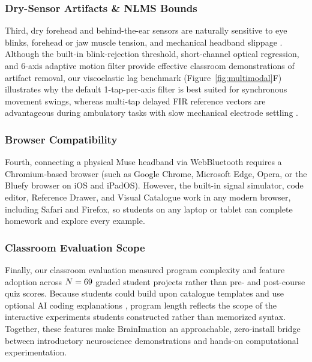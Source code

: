 \documentclass[11pt]{article}
\begin{document}
\subsubsection{Dry-Sensor Artifacts \& NLMS Bounds}
Third, dry forehead and behind-the-ear sensors are naturally sensitive to eye blinks, forehead or jaw muscle tension, and mechanical headband slippage \citep{lotte2013flaws,mathewson2017high,saager2005direct,wyser2020short}. Although the built-in blink-rejection threshold, short-channel optical regression, and 6-axis adaptive motion filter provide effective classroom demonstrations of artifact removal, our viscoelastic lag benchmark (Figure~\ref{fig:multimodal}F) illustrates why the default 1-tap-per-axis filter is best suited for synchronous movement swings, whereas multi-tap delayed FIR reference vectors are advantageous during ambulatory tasks with slow mechanical electrode settling \citep{rosanne2021adaptive,klug2022bemobil}.

\subsubsection{Browser Compatibility}
Fourth, connecting a physical Muse headband via WebBluetooth requires a Chromium-based browser (such as Google Chrome, Microsoft Edge, Opera, or the Bluefy browser on iOS and iPadOS). However, the built-in signal simulator, code editor, Reference Drawer, and Visual Catalogue work in any modern browser, including Safari and Firefox, so students on any laptop or tablet can complete homework and explore every example.

\subsubsection{Classroom Evaluation Scope}
Finally, our classroom evaluation measured program complexity and feature adoption across $N = 69$ graded student projects rather than pre- and post-course quiz scores. Because students could build upon catalogue templates and use optional AI coding explanations \citep{clindeffarges2026socrates}, program length reflects the scope of the interactive experiments students constructed rather than memorized syntax. Together, these features make BrainImation an approachable, zero-install bridge between introductory neuroscience demonstrations and hands-on computational experimentation.
\end{document}
